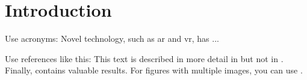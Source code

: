 \setcounter{chapter}{0}

\chapter{Introduction}\label{sec:introduction}


Use acronyms: Novel technology, such as \ac{ar} and \ac{vr}, has ...


Use references like this: This text is described in more detail in  but not in . Finally,  contains valuable results. For figures with multiple images, you can use  .